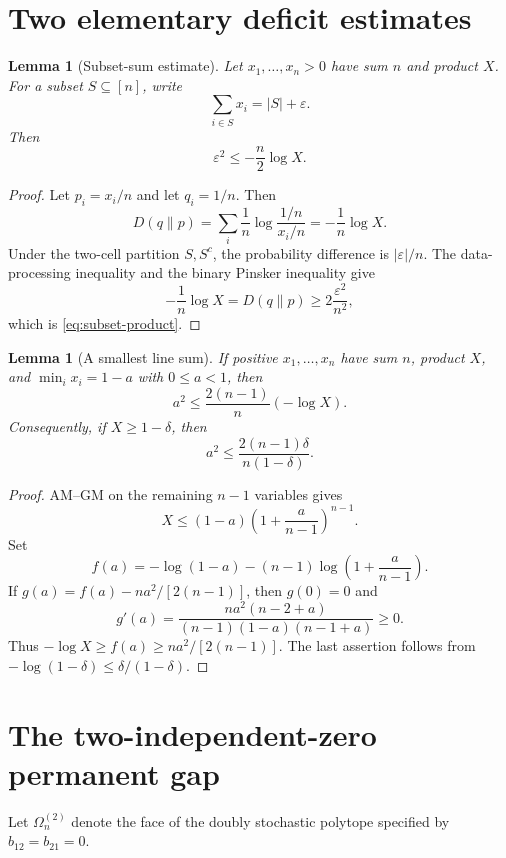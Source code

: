 \documentclass[11pt]{article}
\newtheorem{lemma}[theorem]{Lemma}
\theoremstyle{remark}
\begin{document}
\section{Two elementary deficit estimates}
\begin{lemma}[Subset-sum estimate]\label{lem:subset}
Let $x_1,\dots,x_n>0$ have sum $n$ and product $X$. For a subset $S\subseteq[n]$, write
\[
 \sum_{i\in S}x_i=|S|+\varepsilon.
\]
Then
\begin{equation}\label{eq:subset-product}
 \varepsilon^2\le-\frac n2\log X.
\end{equation}
\end{lemma}
\begin{proof}
Let $p_i=x_i/n$ and let $q_i=1/n$. Then
\[
 D(q\|p)=\sum_i\frac1n\log\frac{1/n}{x_i/n}
 =-\frac1n\log X.
\]
Under the two-cell partition $S,S^c$, the probability difference is $|\varepsilon|/n$. The data-processing inequality and the binary Pinsker inequality give
\[
 -\frac1n\log X=D(q\|p)\ge 2\frac{\varepsilon^2}{n^2},
\]
which is \eqref{eq:subset-product}.
\end{proof}

\begin{lemma}[A smallest line sum]\label{lem:marginal-deficit}
If positive $x_1,\dots,x_n$ have sum $n$, product $X$, and $\min_i x_i=1-a$ with $0\le a<1$, then
\begin{equation}\label{eq:a-product}
 a^2\le\frac{2(n-1)}n(-\log X).
\end{equation}
Consequently, if $X\ge1-\delta$, then
\begin{equation}\label{eq:a-delta}
 a^2\le\frac{2(n-1)\delta}{n(1-\delta)}.
\end{equation}
\end{lemma}
\begin{proof}
AM--GM on the remaining $n-1$ variables gives
\[
 X\le(1-a)\left(1+\frac a{n-1}\right)^{n-1}.
\]
Set
\[
 f(a)=-\log(1-a)-(n-1)\log\left(1+\frac a{n-1}\right).
\]
If $g(a)=f(a)-na^2/[2(n-1)]$, then $g(0)=0$ and
\[
 g'(a)=\frac{na^2(n-2+a)}{(n-1)(1-a)(n-1+a)}\ge0.
\]
Thus $-\log X\ge f(a)\ge na^2/[2(n-1)]$. The last assertion follows from
$-\log(1-\delta)\le\delta/(1-\delta)$.
\end{proof}

\section{The two-independent-zero permanent gap}
Let $\Omega_n^{(2)}$ denote the face of the doubly stochastic polytope specified by
$b_{12}=b_{21}=0$.
\end{document}
